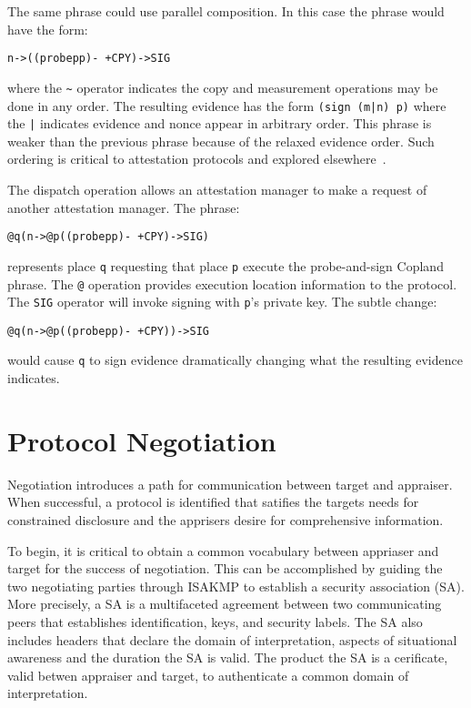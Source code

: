 \documentclass[sigconf,authordraft]{acmart}
\begin{document}
The same phrase could use parallel composition.  In this case the
phrase would have the form:

\begin{alltt}
  n -> ((probe p p) -~+ CPY) -> SIG
\end{alltt}

\noindent where the \verb+~+ operator indicates the copy and
measurement operations may be done in any order.  The resulting
evidence has the form \verb+(sign (m|n) p)+ where the \verb+|+
indicates evidence and nonce appear in arbitrary order.  This phrase
is weaker than the previous phrase because of the relaxed evidence
order.  Such ordering is critical to attestation protocols and
explored elsewhere~\cite{Rowe:2016bi}.

The dispatch operation allows an attestation manager to make a request
of another attestation manager.  The phrase:

\begin{alltt}
  @q(n -> @p((probe p p) -~+ CPY) -> SIG)
\end{alltt}

\noindent represents place \verb+q+ requesting that place \verb+p+
execute the probe-and-sign Copland phrase.  The \verb+@+ operation
provides execution location information to the protocol.  The
\verb+SIG+ operator will invoke signing with \verb+p+'s private
key. The subtle change:

\begin{alltt}
  @q(n -> @p((probe p p) -~+ CPY)) -> SIG
\end{alltt}

\noindent would cause \verb+q+ to sign evidence dramatically changing
what the resulting evidence indicates.

\section{Protocol Negotiation}

Negotiation introduces a path for
communication between target and appraiser. When successful, a protocol is identified
that satifies the targets needs for constrained disclosure and the
apprisers desire for comprehensive information.

To begin, it is critical to obtain a common vocabulary between appriaser and target for the success of negotiation. This can be accomplished by guiding the two negotiating parties through ISAKMP to establish a security association (SA).  More precisely,
a SA is a multifaceted agreement between two communicating peers that
establishes identification, keys, and security labels. The SA also
includes headers that declare the domain of interpretation, aspects of 
situational awareness and the duration the SA is valid. The product
the SA is a cerificate, valid betwen appraiser and target, to
authenticate a common domain of interpretation.
\end{document}
